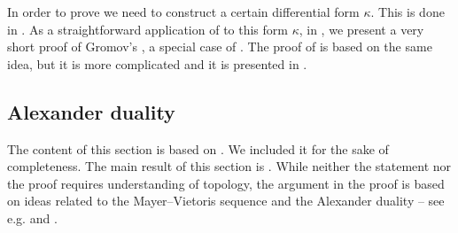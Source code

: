 \documentclass[intlimits,12pt,reqno]{amsart}
\numberwithin{equation}{section}
\theoremstyle{definition}
\begin{document}
In order to prove  we need to construct a certain differential form $\kappa$. This is done in .
As a straightforward application of  to this form $\kappa$, in , we present a very short proof of Gromov's , a special case of . The proof of  is based on the same idea, but it is more complicated and it is presented in .



\subsection{Alexander duality}
\label{LN}
The content of this section is based on \cite{HS23}. We included it for the sake of completeness. 
The main result of this section is . While neither the statement nor the proof requires understanding of topology, the argument in the proof is based on ideas related to the Mayer–Vietoris sequence and the Alexander duality -- see e.g. \cite[Chapter~5]{MT97} and \cite[Corollary~1.29]{Vick}.
\end{document}
